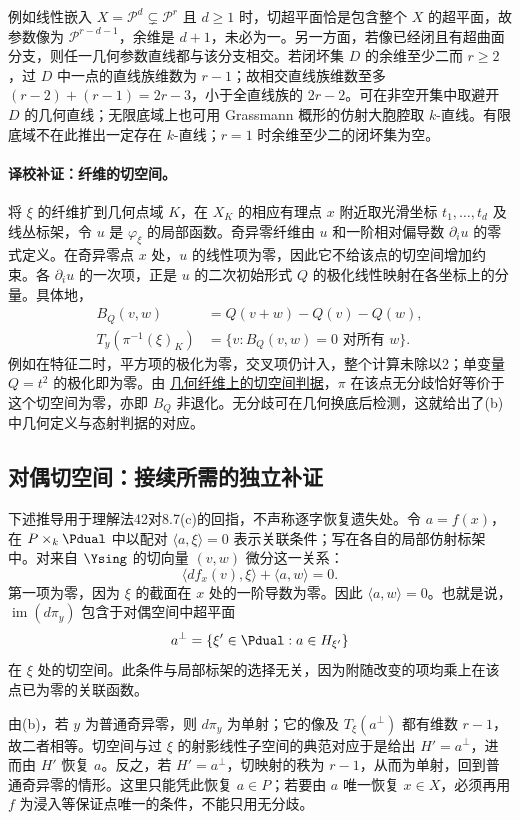 \documentclass[UTF8,a4paper]{ctexbook}
\newcommand{\PP}{\mathscr P}
\begin{document}
例如线性嵌入 $X=\PP^d\subsetneq \PP^r$ 且 $d\ge1$ 时，切超平面恰是包含整个 $X$ 的超平面，故参数像为 $\PP^{r-d-1}$，余维是 $d+1$，未必为一。另一方面，若像已经闭且有超曲面分支，则任一几何参数直线都与该分支相交。若闭坏集 $D$ 的余维至少二而 $r\ge2$，过 $D$ 中一点的直线族维数为 $r-1$；故相交直线族维数至多 $(r-2)+(r-1)=2r-3$，小于全直线族的 $2r-2$。可在非空开集中取避开 $D$ 的几何直线；无限底域上也可用 Grassmann 概形的仿射大胞腔取 $k$-直线。有限底域不在此推出一定存在 $k$-直线；$r=1$ 时余维至少二的闭坏集为空。

\paragraph{译校补证：纤维的切空间。}
将 $\xi$ 的纤维扩到几何点域 $K$，在 $X_K$ 的相应有理点 $x$ 附近取光滑坐标 $t_1,\ldots,t_d$ 及线丛标架，令 $u$ 是 $\varphi_\xi$ 的局部函数。奇异零纤维由 $u$ 和一阶相对偏导数 $\partial_i u$ 的零式定义。在奇异零点 $x$ 处，$u$ 的线性项为零，因此它不给该点的切空间增加约束。各 $\partial_i u$ 的一次项，正是 $u$ 的二次初始形式 $Q$ 的极化线性映射在各坐标上的分量。具体地，
\[
\begin{aligned}
 B_Q(v,w)&=Q(v+w)-Q(v)-Q(w),\\
 T_{y}(\pi^{-1}(\xi)_K)&=\{v:B_Q(v,w)=0\text{ 对所有 }w\}.
\end{aligned}
\]
例如在特征二时，平方项的极化为零，交叉项仍计入，整个计算未除以2；单变量 $Q=t^2$ 的极化即为零。由 \href{https://stacks.math.columbia.edu/tag/0B2G}{几何纤维上的切空间判据}，$\pi$ 在该点无分歧恰好等价于这个切空间为零，亦即 $B_Q$ 非退化。无分歧可在几何换底后检测，这就给出了(b)中几何定义与态射判据的对应。

\subsection*{对偶切空间：接续所需的独立补证}
下述推导用于理解法42对8.7(c)的回指，不声称逐字恢复遗失处。令 $a=f(x)$，在 $P\times_k\Pdual$ 中以配对 $\langle a,\xi\rangle=0$ 表示关联条件；写在各自的局部仿射标架中。对来自 $\Ysing$ 的切向量 $(v,w)$ 微分这一关系：
\[
 \langle df_x(v),\xi\rangle+\langle a,w\rangle=0.
\]
第一项为零，因为 $\xi$ 的截面在 $x$ 处的一阶导数为零。因此 $\langle a,w\rangle=0$。也就是说，$\operatorname{im}(d\pi_y)$ 包含于对偶空间中超平面
\[
 a^\perp=\{\xi'\in\Pdual : a\in H_{\xi'}\}
\]
在 $\xi$ 处的切空间。此条件与局部标架的选择无关，因为附随改变的项均乘上在该点已为零的关联函数。

由(b)，若 $y$ 为普通奇异零，则 $d\pi_y$ 为单射；它的像及 $T_\xi(a^\perp)$ 都有维数 $r-1$，故二者相等。切空间与过 $\xi$ 的射影线性子空间的典范对应于是给出 $H'=a^\perp$，进而由 $H'$ 恢复 $a$。反之，若 $H'=a^\perp$，切映射的秩为 $r-1$，从而为单射，回到普通奇异零的情形。这里只能凭此恢复 $a\in P$；若要由 $a$ 唯一恢复 $x\in X$，必须再用 $f$ 为浸入等保证点唯一的条件，不能只用无分歧。
\end{document}
